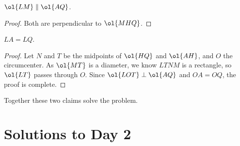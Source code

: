 \begin{claim*}
  $\ol{LM} \parallel \ol{AQ}$.
\end{claim*}
\begin{proof}
  Both are perpendicular to $\ol{MHQ}$.
\end{proof}
\begin{claim*}
  $LA = LQ$.
\end{claim*}
\begin{proof}
  Let $N$ and $T$ be the midpoints of $\ol{HQ}$ and $\ol{AH}$,
  and $O$ the circumcenter.
  As $\ol{MT}$ is a diameter, we know $LTNM$ is a rectangle,
  so $\ol{LT}$ passes through $O$.
  Since $\ol{LOT} \perp \ol{AQ}$ and $OA=OQ$, the proof is complete.
\end{proof}
Together these two claims solve the problem.
\pagebreak

\section{Solutions to Day 2}